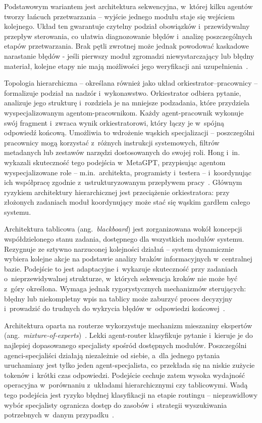 Podstawowym wariantem jest architektura sekwencyjna, w~której kilku agentów
tworzy łańcuch przetwarzania -- wyjście jednego modułu staje się wejściem
kolejnego. Układ ten gwarantuje czytelny podział obowiązków i~przewidywalny
przepływ sterowania, co ułatwia diagnozowanie błędów i~analizę poszczególnych
etapów przetwarzania. Brak pętli zwrotnej może jednak powodować kaskadowe
narastanie błędów - jeśli pierwszy moduł zgromadzi niewystarczający lub błędny
materiał, kolejne etapy nie mają możliwości jego weryfikacji ani
uzupełnienia~\cite{wang2024survey, wu2024autogen}.

Topologia hierarchiczna -- określana również jako układ
orkiestrator--pracownicy -- formalizuje podział na nadzór i~wykonawstwo.
Orkiestrator odbiera pytanie, analizuje jego strukturę i~rozdziela je na
mniejsze podzadania, które przydziela wyspecjalizowanym agentom-pracownikom.
Każdy agent-pracownik wykonuje swój fragment i~zwraca wynik orkiestratorowi,
który łączy je w~spójną odpowiedź końcową. Umożliwia to wdrożenie wąskich
specjalizacji -- poszczególni pracownicy mogą korzystać z~różnych instrukcji
systemowych, filtrów metadanych lub zestawów narzędzi dostosowanych do swojej
roli. Hong i~in. wykazali skuteczność tego podejścia w~MetaGPT, przypisując
agentom wyspecjalizowane role -- m.in.\ architekta, programisty i~testera --
i~koordynując ich współpracę zgodnie z~ustrukturyzowanym przepływem
pracy~\cite{hong2023metagpt}. Głównym ryzykiem architektury hierarchicznej jest
przeciążenie orkiestratora: przy złożonych zadaniach moduł koordynujący może
stać się wąskim gardłem całego systemu.

Architektura tablicowa (ang.~\textit{blackboard}) jest zorganizowana wokół
koncepcji współdzielonego stanu zadania, dostępnego dla wszystkich modułów
systemu. Rezygnuje ze sztywno narzuconej kolejności działań -- system
dynamicznie wybiera kolejne akcje na podstawie analizy braków informacyjnych
w~centralnej bazie. Podejście to jest adaptacyjne i~wykazuje skuteczność przy
zadaniach o~nieprzewidywalnej strukturze, w~których sekwencja kroków nie może
być z~góry określona. Wymaga jednak rygorystycznych mechanizmów sterujących:
błędny lub niekompletny wpis na tablicy może zaburzyć proces decyzyjny
i~prowadzić do trudnych do wykrycia błędów w~odpowiedzi
końcowej~\cite{wang2024survey}.

Architektura oparta na routerze wykorzystuje mechanizm mieszaniny ekspertów
(ang.~\textit{mixture-of-experts})~\cite{shazeer2017outrageously}. Lekki
agent-router klasyfikuje pytanie i~kieruje je do najlepiej dopasowanego
specjalisty spośród dostępnych modułów. Poszczególni agenci-specjaliści
działają niezależnie od siebie, a~dla jednego pytania uruchamiany jest tylko
jeden agent-specjalista, co przekłada się na niskie zużycie tokenów i~krótki
czas odpowiedzi. Podejście cechuje zatem wysoka wydajność operacyjna
w~porównaniu z~układami hierarchicznymi czy tablicowymi. Wadą tego podejścia
jest ryzyko błędnej klasyfikacji na etapie routingu -- nieprawidłowy wybór
specjalisty ogranicza dostęp do zasobów i~strategii wyszukiwania potrzebnych
w~danym przypadku~\cite{wang2024survey, guo2024large}.

